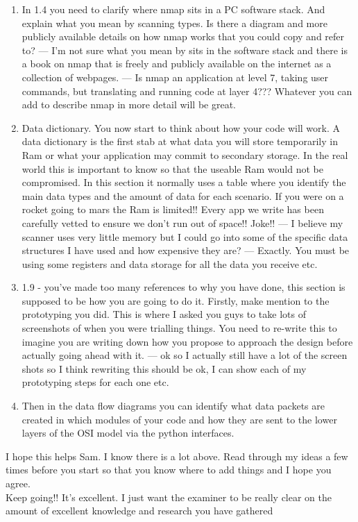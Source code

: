 \documentclass{article}
\begin{document}
\begin{enumerate}
  \item{In 1.4 you need to clarify where nmap sits in a PC software stack. And explain what you mean by scanning types. Is there a diagram and more publicly available details on how nmap works that you could copy and refer to? --- I'm not sure what you mean by sits in the software stack and there is a book on nmap that is freely and publicly available on the internet as a collection of webpages. --- Is nmap an application at level 7, taking user commands, but translating and running code at layer 4??? Whatever you can add to describe nmap in more detail will be great.}
  \item{Data dictionary. You now start to think about how your code will work. A data dictionary is the first stab at what data you will store temporarily in Ram or what your application may commit to secondary storage. In the real world this is important to know so that the useable Ram would not be  compromised.  In this section it normally uses a table where you identify the main data types and the amount of data for each scenario. If you were on a rocket going to mars the Ram is limited!! Every app we write has been carefully vetted to ensure we don’t run out of space!! Joke!! --- I believe my scanner uses very little memory but I could go into some of the specific data structures I have used and how expensive they are? --- Exactly. You must be using some registers and data storage for all the data you receive etc.}
  \item{1.9 - you’ve made too many references to why you have done, this section is supposed to be how you are going to do it. Firstly, make mention to the prototyping you did. This is where I asked you guys to take lots of screenshots of when you were trialling things. You need to re-write this to imagine you are writing down how you propose to approach the design before actually going ahead with it. --- ok so I actually still have a lot of the screen shots so I think rewriting this should be ok, I can show each of my prototyping steps for each one etc.}
  \item{Then in the data flow diagrams you can identify what data packets are created in which modules of your code and how they are sent to the lower layers of the OSI model via the python interfaces.}
\end{enumerate}


I hope this helps Sam. I know there is a lot above. Read through my ideas a few times before you start so that you know where to add things and I hope you agree. \\
                    

Keep going!! It’s excellent. I just want the examiner to be really clear on the amount of excellent knowledge and research you have gathered
\end{document}
